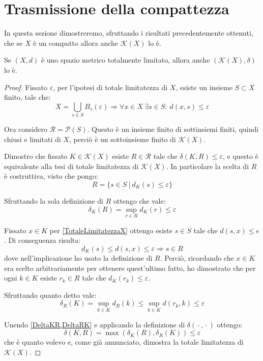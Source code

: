 \section{Trasmissione della compattezza}
In questa sezione dimostreremo, sfruttando i risultati precedentemente ottenuti, che se $X$ è un compatto allora anche $\mathcal{K}(X)$ lo è.

\begin{lemma}\label{TotaleLimitatezzaKX}
	Se $(X,d)$ è uno spazio metrico totalmente limitato, allora anche $(\mathcal{K}(X),\delta)$ lo è.
\end{lemma}
\begin{proof}
	Fissato $\varepsilon$, per l'ipotesi di totale limitatezza di $X$, esiste un insieme $S\subset X$ finito, tale che:
	\begin{equation}\label{TotaleLimitatezzaX}
		X=\bigcup_{s\in S} B_{s}(\varepsilon) \Longrightarrow 
		\forall x\in X\ \exists s\in S:\ d(x,s)\le \varepsilon
	\end{equation}

	Ora considero $\mathcal{R}=\mathcal{P}(S)$. Questo è un insieme finito di sottinsiemi finiti, quindi chiusi e limitati di $X$, perciò è un sottoinsieme finito di $\mathcal{K}(X)$. 
	
	Dimostro che fissato $K\in\mathcal{K}(X)$ esiste $R\in \mathcal{R}$ tale che $\delta(K,R)\le \varepsilon$, e questo è equivalente alla tesi di totale limitatezza di $\mathcal{K}(X)$. In particolare la scelta di $R$ è costruttiva, visto che pongo:
	\begin{equation*}
		R=\{s\in S\ |\ d_K(s)\le \varepsilon\}
	\end{equation*}
	
	Sfruttando la sola definizione di $R$ ottengo che vale:
	\begin{equation}\label{DeltaKR}
		\delta_K(R)=\sup_{r\in R} d_K(r) \le \varepsilon
	\end{equation}
	
	Fissato $x\in K$ per \cref{TotaleLimitatezzaX} ottengo esiste $s\in S$ tale che $d(s,x)\le \epsilon$. Di conseguenza risulta:
	\begin{equation*}
		d_K(s)\le d(s,x) \le \varepsilon \Longrightarrow s\in R
	\end{equation*}
	dove nell'implicazione ho usato la definizione di $R$.
	Perciò, ricordando che $x\in K$ era scelto arbitrariamente per ottenere quest'ultimo fatto, ho dimostrato che per ogni $k\in K$ esiste $r_k\in R$ tale che $d_K(r_k)\le \varepsilon$.
	
	Sfruttando quanto detto vale:
	\begin{equation}\label{DeltaRK}
		\delta_R(K)=\sup_{k\in K} d_R(k) \le \sup_{k\in K} d(r_k,k) \le \varepsilon
	\end{equation}
	
	Unendo \cref{DeltaKR,DeltaRK} e applicando la definizione di $\delta({}\cdot{},{}\cdot{})$ ottengo:
	\begin{equation*}
		\delta(K,R)=\max\left(\delta_K(R),\delta_R(K)\right)\le \varepsilon
	\end{equation*}
	che è quanto volevo e, come già annunciato, dimostra la totale limitatezza di $\mathcal{K}(X)$.
\end{proof}

